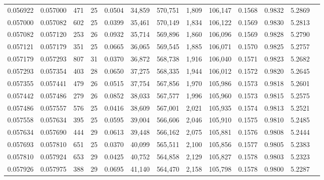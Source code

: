 \begin{tabular}{rrrrrrrrrrrrr}
0.056922 & 0.057000 & 471 &  25 &                                     0.0504 &  34,859 & 570,751 &   1,809 & 106,147 & 0.1568 & 0.9832 & 5.2869 \\
0.057000 & 0.057082 & 602 &  25 &                                     0.0399 &  35,461 & 570,149 &   1,834 & 106,122 & 0.1569 & 0.9830 & 5.2813 \\
0.057082 & 0.057120 & 253 &  26 &                                     0.0932 &  35,714 & 569,896 &   1,860 & 106,096 & 0.1569 & 0.9828 & 5.2790 \\
0.057121 & 0.057179 & 351 &  25 &                                     0.0665 &  36,065 & 569,545 &   1,885 & 106,071 & 0.1570 & 0.9825 & 5.2757 \\
0.057179 & 0.057293 & 807 &  31 &                                     0.0370 &  36,872 & 568,738 &   1,916 & 106,040 & 0.1571 & 0.9823 & 5.2682 \\
0.057293 & 0.057354 & 403 &  28 &                                     0.0650 &  37,275 & 568,335 &   1,944 & 106,012 & 0.1572 & 0.9820 & 5.2645 \\
0.057355 & 0.057441 & 479 &  26 &                                     0.0515 &  37,754 & 567,856 &   1,970 & 105,986 & 0.1573 & 0.9818 & 5.2601 \\
0.057442 & 0.057486 & 279 &  26 &                                     0.0852 &  38,033 & 567,577 &   1,996 & 105,960 & 0.1573 & 0.9815 & 5.2575 \\
0.057486 & 0.057557 & 576 &  25 &                                     0.0416 &  38,609 & 567,001 &   2,021 & 105,935 & 0.1574 & 0.9813 & 5.2521 \\
0.057558 & 0.057634 & 395 &  25 &                                     0.0595 &  39,004 & 566,606 &   2,046 & 105,910 & 0.1575 & 0.9810 & 5.2485 \\
0.057634 & 0.057690 & 444 &  29 &                                     0.0613 &  39,448 & 566,162 &   2,075 & 105,881 & 0.1576 & 0.9808 & 5.2444 \\
0.057693 & 0.057810 & 651 &  25 &                                     0.0370 &  40,099 & 565,511 &   2,100 & 105,856 & 0.1577 & 0.9805 & 5.2383 \\
0.057810 & 0.057924 & 653 &  29 &                                     0.0425 &  40,752 & 564,858 &   2,129 & 105,827 & 0.1578 & 0.9803 & 5.2323 \\
0.057926 & 0.057975 & 388 &  29 &                                     0.0695 &  41,140 & 564,470 &   2,158 & 105,798 & 0.1578 & 0.9800 & 5.2287 \\

\end{tabular}
